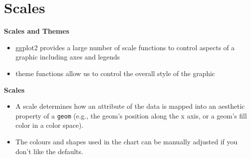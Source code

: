 \documentclass{beamer}
\begin{document}
\section*{Scales}
\begin{frame}
	\Large
\noindent \textbf{Scales and Themes}
	\begin{itemize}
	\item ggplot2 provides a large number of scale functions
	to control aspects of a graphic including axes and
	legends
	\item theme functions allow us to control the overall style
	of the graphic
	\end{itemize}

\end{frame}

\begin{frame}
	\Large
	\noindent \textbf{Scales}
	\begin{itemize}
		\item A scale determines how an attribute of the data is mapped into an aesthetic property of a \texttt{geom} (e.g., the geom's position along the x axis, or a geom's fill color in a color space).
		\item The colours and shapes used in the chart can be manually adjusted if you don’t like the defaults.
	\end{itemize}
	
\end{frame}
\end{document}
